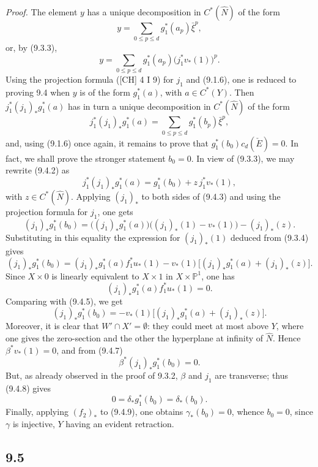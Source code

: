 \documentclass[11pt]{article}
\begin{document}
\emph{Proof.} The element $y$ has a unique decomposition in $C^*(\widehat N)$ of the form
\[
y=\sum_{0\le p\le d}g_1^*(a_p)\bar\xi^p,
\]
or, by (9.3.3),
\[
y=\sum_{0\le p\le d}g_1^*(a_p)\bigl(j_1^*v_*(1)\bigr)^p.
\tag{9.4.1}
\]
Using the projection formula ([CH] 4 I 9) for $j_1$ and (9.1.6), one is reduced to proving 9.4 when $y$ is of the form $g_1^*(a)$, with $a\in C^*(Y)$. Then $j_1^*(j_1)_*g_1^*(a)$ has in turn a unique decomposition in $C^*(\widehat N)$ of the form
\[
j_1^*(j_1)_*g_1^*(a)=\sum_{0\le p\le d}g_1^*(b_p)\bar\xi^p,
\tag{9.4.2}
\]
and, using (9.1.6) once again, it remains to prove that $g_1^*(b_0)c_d(\check E)=0$. In fact, we shall prove the stronger statement $b_0=0$. In view of (9.3.3), we may rewrite (9.4.2) as
\[
j_1^*(j_1)_*g_1^*(a)=g_1^*(b_0)+z\,j_1^*v_*(1),
\tag{9.4.3}
\]
with $z\in C^*(\widehat N)$. Applying $(j_1)_*$ to both sides of (9.4.3) and using the projection formula for $j_1$, one gets
\[
(j_1)_*g_1^*(b_0)=\bigl((j_1)_*g_1^*(a)\bigr)\bigl((j_1)_*(1)-v_*(1)\bigr)-(j_1)_*(z).
\tag{9.4.4}
\]
Substituting in this equality the expression for $(j_1)_*(1)$ deduced from (9.3.4) gives
\[
(j_1)_*g_1^*(b_0)=
(j_1)_*g_1^*(a)f_1^*u_*(1)-v_*(1)\bigl[(j_1)_*g_1^*(a)+(j_1)_*(z)\bigr].
\tag{9.4.5}
\]
Since $X\times0$ is linearly equivalent to $X\times1$ in $X\times\mathbb P^1$, one has
\[
(j_1)_*g_1^*(a)f_1^*u_*(1)=0.
\tag{9.4.6}
\]
Comparing with (9.4.5), we get
\[
(j_1)_*g_1^*(b_0)=-v_*(1)\bigl[(j_1)_*g_1^*(a)+(j_1)_*(z)\bigr].
\tag{9.4.7}
\]
Moreover, it is clear that $W'\cap X'=\emptyset$: they could meet at most above $Y$, where one gives the zero-section and the other the hyperplane at infinity of $\widehat N$. Hence $\beta^*v_*(1)=0$, and from (9.4.7)
\[
\beta^*(j_1)_*g_1^*(b_0)=0.
\tag{9.4.8}
\]
But, as already observed in the proof of 9.3.2, $\beta$ and $j_1$ are transverse; thus (9.4.8) gives
\[
0=\delta_*g_1^*(b_0)=\delta_*(b_0).
\tag{9.4.9}
\]
Finally, applying $(f_2)_*$ to (9.4.9), one obtains $\gamma_*(b_0)=0$, whence $b_0=0$, since $\gamma$ is injective, $Y$ having an evident retraction.

\subsection*{9.5}
\end{document}
